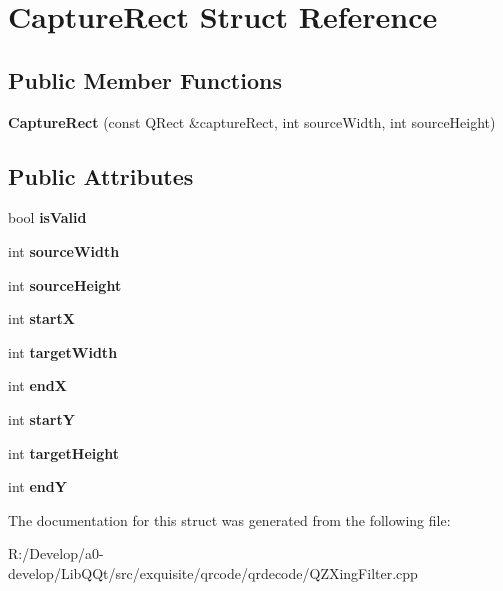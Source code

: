 \hypertarget{struct_capture_rect}{}\section{Capture\+Rect Struct Reference}
\label{struct_capture_rect}
\subsection*{Public Member Functions}
\begin{DoxyCompactItemize}
\item 
\mbox{\label{struct_capture_rect_aecca1662ea69923f0b7d016a448e7563}} 
{\bfseries Capture\+Rect} (const Q\+Rect \&capture\+Rect, int source\+Width, int source\+Height)
\end{DoxyCompactItemize}
\subsection*{Public Attributes}
\begin{DoxyCompactItemize}
\item 
\mbox{\label{struct_capture_rect_a888cc4ec1aab19329a0a05f5b90dba66}} 
bool {\bfseries is\+Valid}
\item 
\mbox{\label{struct_capture_rect_a28930f544338c8a0bf92cf6a6dad7530}} 
int {\bfseries source\+Width}
\item 
\mbox{\label{struct_capture_rect_ad83cad0e2257cdc5f277f90060720914}} 
int {\bfseries source\+Height}
\item 
\mbox{\label{struct_capture_rect_ae811f851ff153644be2158e758e9c4fa}} 
int {\bfseries startX}
\item 
\mbox{\label{struct_capture_rect_a47143dde32dd997e01f93d50999f73b9}} 
int {\bfseries target\+Width}
\item 
\mbox{\label{struct_capture_rect_a6e9f05f4ffd78905ca4307b6a15e288d}} 
int {\bfseries endX}
\item 
\mbox{\label{struct_capture_rect_a7387b98939bc2558f6563417dc3a76e0}} 
int {\bfseries startY}
\item 
\mbox{\label{struct_capture_rect_a82ea47bb1257ae7143e9cfcba21c4190}} 
int {\bfseries target\+Height}
\item 
\mbox{\label{struct_capture_rect_acfdd266a7b1cd41a1f9baa67180ed65c}} 
int {\bfseries endY}
\end{DoxyCompactItemize}


The documentation for this struct was generated from the following file\+:\begin{DoxyCompactItemize}
\item 
R\+:/\+Develop/a0-\/develop/\+Lib\+Q\+Qt/src/exquisite/qrcode/qrdecode/Q\+Z\+Xing\+Filter.\+cpp\end{DoxyCompactItemize}
